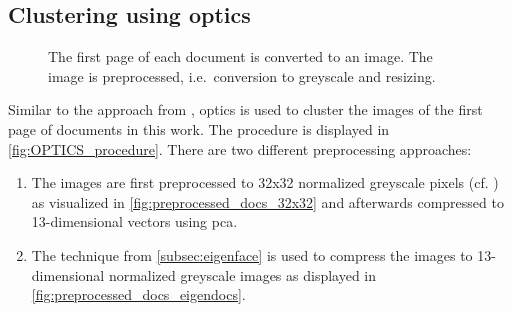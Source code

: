 \subsection{Clustering using \acs*{optics}}\label{subsec:impl-optics}

\begin{figure}[!htp] %
    \centering
    
    \caption[\acs*{optics} procedure]{The first page of each document is converted to an image.
    The image is preprocessed, i.e.\ conversion to greyscale and resizing.
    }
    \label{fig:OPTICS_procedure}
\end{figure}

Similar to the approach from \citeauthor{OPTICS1999}, \ac{optics} is used to cluster the images of the first page of documents in this work.
The procedure is displayed in \autoref{fig:OPTICS_procedure}.
There are two different preprocessing approaches:
\begin{enumerate}
    \item \label{pt:32}The images are first preprocessed to 32x32 normalized greyscale pixels (cf. \cite{OPTICS1999}) 
    as visualized in \autoref{fig:preprocessed_docs_32x32}
    and afterwards compressed to 13-dimensional vectors using \ac{pca}.
    \item \label{pt:eigendocs}The technique \eigendocs{} from \autoref{subsec:eigenface} 
    is used to compress the images to 13-dimensional normalized greyscale images as displayed in \autoref{fig:preprocessed_docs_eigendocs}.
\end{enumerate}


